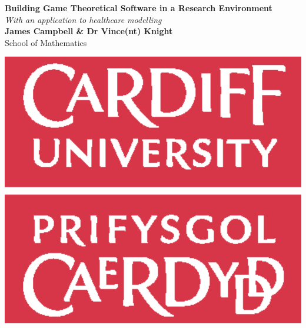 \documentclass[a0,landscape]{a0poster}
\begin{document}
\begin{minipage}[b]{0.7\linewidth}
\veryHuge \color{NavyBlue} \textbf{Building Game Theoretical Software in a Research Environment} \color{Black}\\ %
\Huge\textit{With an application to healthcare modelling}\\[1cm] %
\huge \textbf{James Campbell \& Dr Vince(nt) Knight}\\ %
\huge School of Mathematics\\ %
\end{minipage}
%
%
\begin{minipage}[b]{0.3\linewidth}
\centering
\includegraphics[width=15cm]{Images/logo.eps}
\end{minipage}
\end{document}
